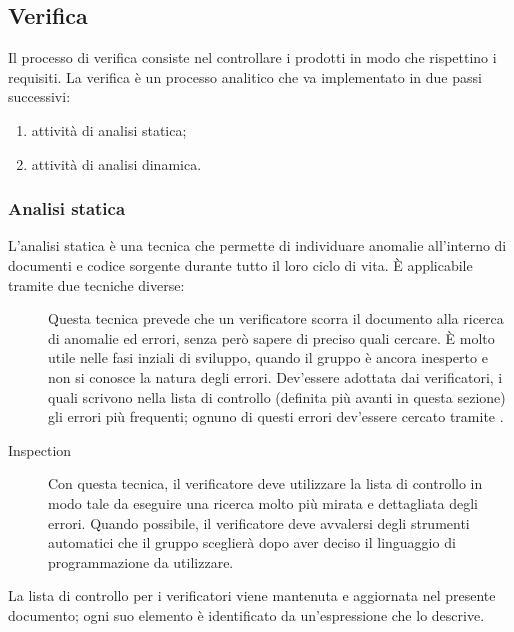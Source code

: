 


\subsection{Verifica}
Il processo di verifica consiste nel controllare i prodotti in modo che rispettino i requisiti. %
La verifica è un processo analitico che va implementato in due passi successivi:
\begin{enumerate}
	\item attività di analisi statica;
	\item attività di analisi dinamica.
\end{enumerate}

	\subsubsection{Analisi statica}
	L'analisi statica è una tecnica che permette di individuare anomalie all'interno di documenti e codice sorgente durante tutto il loro ciclo di vita. È applicabile tramite due tecniche diverse:
	\begin{description}
		\item[] Questa tecnica prevede che un verificatore scorra il documento alla ricerca di anomalie ed errori, senza però sapere di preciso quali cercare. È molto utile nelle fasi inziali di sviluppo, quando il gruppo è ancora inesperto e non si conosce la natura degli errori. Dev'essere adottata dai verificatori, i quali scrivono nella lista di controllo (definita più avanti in questa sezione) gli errori più frequenti; ognuno di questi errori dev'essere cercato tramite .
		\item[Inspection] Con questa tecnica, il verificatore deve utilizzare la lista di controllo in modo tale da eseguire una ricerca molto più mirata e dettagliata degli errori. Quando possibile, il verificatore deve avvalersi degli strumenti automatici che il gruppo sceglierà dopo aver deciso il linguaggio di programmazione da utilizzare.
	\end{description}
	La lista di controllo per i verificatori viene mantenuta e aggiornata nel presente documento; ogni suo elemento è identificato da un'espressione che lo descrive.
